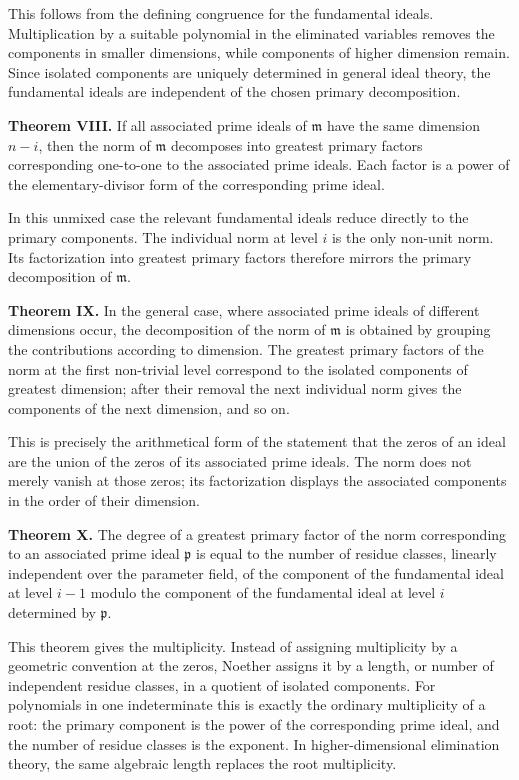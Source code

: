 \documentclass[11pt]{article}
\begin{document}
This follows from the defining congruence for the fundamental ideals. Multiplication by a suitable polynomial in the eliminated variables removes the components in smaller dimensions, while components of higher dimension remain. Since isolated components are uniquely determined in general ideal theory, the fundamental ideals are independent of the chosen primary decomposition.

\textbf{Theorem VIII.} If all associated prime ideals of $\mathfrak m$ have the same dimension $n-i$, then the norm of $\mathfrak m$ decomposes into greatest primary factors corresponding one-to-one to the associated prime ideals. Each factor is a power of the elementary-divisor form of the corresponding prime ideal.

In this unmixed case the relevant fundamental ideals reduce directly to the primary components. The individual norm at level $i$ is the only non-unit norm. Its factorization into greatest primary factors therefore mirrors the primary decomposition of $\mathfrak m$.

\textbf{Theorem IX.} In the general case, where associated prime ideals of different dimensions occur, the decomposition of the norm of $\mathfrak m$ is obtained by grouping the contributions according to dimension. The greatest primary factors of the norm at the first non-trivial level correspond to the isolated components of greatest dimension; after their removal the next individual norm gives the components of the next dimension, and so on.

This is precisely the arithmetical form of the statement that the zeros of an ideal are the union of the zeros of its associated prime ideals. The norm does not merely vanish at those zeros; its factorization displays the associated components in the order of their dimension.

\textbf{Theorem X.} The degree of a greatest primary factor of the norm corresponding to an associated prime ideal $\mathfrak p$ is equal to the number of residue classes, linearly independent over the parameter field, of the component of the fundamental ideal at level $i-1$ modulo the component of the fundamental ideal at level $i$ determined by $\mathfrak p$.

This theorem gives the multiplicity. Instead of assigning multiplicity by a geometric convention at the zeros, Noether assigns it by a length, or number of independent residue classes, in a quotient of isolated components. For polynomials in one indeterminate this is exactly the ordinary multiplicity of a root: the primary component is the power of the corresponding prime ideal, and the number of residue classes is the exponent. In higher-dimensional elimination theory, the same algebraic length replaces the root multiplicity.
\end{document}
